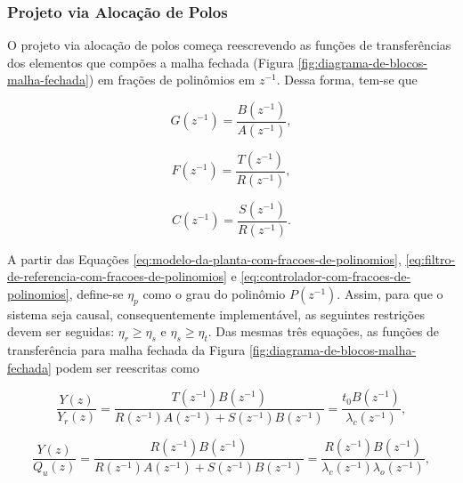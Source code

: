 \subsubsection{Projeto via Alocação de Polos}
\label{subsub:projeto-via-alocacao-de-polos}
O projeto via alocação de polos começa reescrevendo as funções de transferências
dos elementos que compões a malha fechada (Figura
\ref{fig:diagrama-de-blocos-malha-fechada}) em frações de polinômios em
$z^{-1}$. Dessa forma, tem-se que

\begin{equation}
    \label{eq:modelo-da-planta-com-fracoes-de-polinomios}
    G(z^{-1}) = \frac{B(z^{-1})}{A(z^{-1})},
\end{equation}

\begin{equation}
    \label{eq:filtro-de-referencia-com-fracoes-de-polinomios}
    F(z^{-1}) = \frac{T(z^{-1})}{R(z^{-1})},
\end{equation}

\begin{equation}
    \label{eq:controlador-com-fracoes-de-polinomios}
    C(z^{-1}) = \frac{S(z^{-1})}{R(z^{-1})}.
\end{equation}

A partir das Equações \ref{eq:modelo-da-planta-com-fracoes-de-polinomios},
\ref{eq:filtro-de-referencia-com-fracoes-de-polinomios} e
\ref{eq:controlador-com-fracoes-de-polinomios}, define-se $\eta_{p}$ como o grau
do polinômio $P(z^{-1})$. Assim, para que o sistema seja causal,
consequentemente implementável, as seguintes restrições devem ser seguidas:
$\eta_{r} \geq \eta_{s}$ e $\eta_{s} \geq \eta_{t}$. Das mesmas três equações,
as funções de transferência para malha fechada da Figura
\ref{fig:diagrama-de-blocos-malha-fechada} podem ser reescritas como

\begin{equation}
    \label{eq:ft-da-saida-para-referencia}
    \frac{Y(z)}{Y_{r}(z)} = \frac{T(z^{-1})B(z^{-1})}
                                 {R(z^{-1})A(z^{-1})+S(z^{-1})B(z^{-1})}
                          = \frac{t_{0}B(z^{-1})}{\lambda_{c}(z^{-1})},
\end{equation}

\begin{equation}
    \label{eq:ft-da-saida-para-perturbacao-na-entrada}
    \frac{Y(z)}{Q_{u}(z)} = \frac{R(z^{-1})B(z^{-1})}
                                 {R(z^{-1})A(z^{-1})+S(z^{-1})B(z^{-1})}
                          = \frac{R(z^{-1})B(z^{-1})}
                                 {\lambda_{c}(z^{-1})\lambda_{o}(z^{-1})},
\end{equation}

